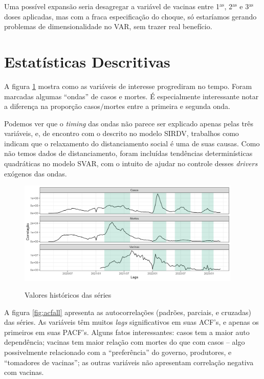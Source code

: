 \documentclass[
    article,
	12pt,				%
	oneside,			%
	a4paper,			%
	english,			%
	brazil,				%
	hyperref = {colorlinks, citecolor=c1d, linkcolor=c2d, urlcolor=c3d, colorlinks}
	]{abntex2}
\newcounter{j}
\begin{document}
Uma possível expansão seria desagregar a variável de vacinas entre 1$^\text{as}$, 2$^\text{as}$ e 3$^\text{as}$ doses aplicadas, mas com a fraca especificação do choque, só estaríamos gerando problemas de dimensionalidade no VAR, sem trazer real benefício.


\section{Estatísticas Descritivas}\label{sec:stat}

A figura \ref{fig:histval} mostra como as variáveis de interesse progrediram no tempo. Foram marcadas algumas ``ondas'' de casos e mortes. É especialmente interessante notar a diferença na proporção casos$/$mortes entre a primeira e segunda onda.

Podemos ver que o \textit{timing} das ondas não parece ser explicado apenas pelas três variáveis, e, de encontro com o descrito no modelo SIRDV, trabalhos como \textcite{Moraes2021} indicam que o relaxamento do distanciamento social é uma de suas causas. Como não temos dados de distanciamento, foram incluídas tendências determinísticas quadráticas no modelo SVAR, com o intuito de ajudar no controle desses \textit{drivers} exógenos das ondas.

\begin{figure}[H]
    \centering
    \caption{Valores históricos das séries}
    \includegraphics[width = 0.95\textwidth]{Figures/stat_historic.png}
    \label{fig:histval}
\end{figure}

A figura \ref{fig:acfall} apresenta as autocorrelações (padrões, parciais, e cruzadas) das séries. As variáveis têm muitos \textit{lags} significativos em suas ACF's, e apenas os primeiros em suas PACF's. Alguns fatos interessantes: casos tem a maior auto dependência; vacinas tem maior relação com mortes do que com casos -- algo possivelmente relacionado com a ``preferência'' do governo, produtores, e ``tomadores de vacinas''; as outras variáveis não apresentam correlação negativa com vacinas.
\end{document}
